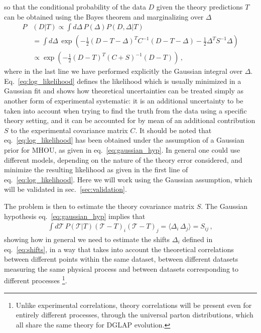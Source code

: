 so that the conditional probability of the data $D$ 
given the theory predictions $T$ can be obtained using the Bayes theorem and marginalizing over $\Delta$ 
\begin{align}
    \label{eq:log_likelihood}
    P&\left(D|T\right) \propto 
    \int d\Delta\, P\left(\Delta\right)P\left(D, \Delta|T\right)  \nonumber\\
    &=\int d\Delta\, \exp\left(-\frac{1}{2}\left(D - T - \Delta\right)^T C^{-1} \left(D-T-\Delta\right) 
    -\frac{1}{2}\Delta^T S^{-1} \Delta \right) \nonumber \\
    &\propto \exp\left(-\frac{1}{2} \left(D-T\right)^T\left(C + S\right)^{-1} \left(D-T\right) \right)\,,
\end{align}
where in the last line we have performed explicitly the Gaussian integral over $\Delta$.
Eq.~\eqref{eq:log_likelihood} defines the likelihood which is usually minimized in a Gaussian fit and shows how
theoretical uncertainties can be treated simply as another form of experimental systematic: 
it is an additional uncertainty to be taken into account when trying to find the truth from the data
using a specific theory setting, and it can be accounted for by mean of an additional contribution $S$ to
the experimental covariance matrix $C$.
It should be noted that eq.~\eqref{eq:log_likelihood} has been obtained under the assumption
of a Gaussian prior for MHOU, as given in eq.~\eqref{eq:gaussian_hyp}. In general one could use different
models, depending on the nature of the theory error considered, and minimize the resulting likelihood as given
in the first line of eq.~\eqref{eq:log_likelihood}. 
Here we will work using the Gaussian assumption, which will be validated in sec.~\ref{sec:validation}.

%
The problem is then to estimate the theory covariance matrix $S$. The Gaussian hypothesis eq.~\eqref{eq:gaussian_hyp}
implies that 
\begin{align}
    \label{eq:def_th_cov_0}
    \int d\mathcal{T} \, P\left(\mathcal{T}|T\right) \left(\mathcal{T}-T\right)_i \left(\mathcal{T}-T\right)_j = 
    \langle \Delta_i \,\Delta_j \rangle = S_{ij}\,,
\end{align}
showing how in general we need to estimate the shifts $\Delta_i$ defined in eq.~\eqref{eq:shifts}, in a way that takes into account
the theoretical correlations between different points within the same dataset, between different datasets
measuring the same physical process and between datasets corresponding to different processes
\footnote{Unlike experimental correlations, theory correlations will be present even for entirely different processes,
through the universal parton distributions, which all share the same theory for DGLAP evolution.}.


